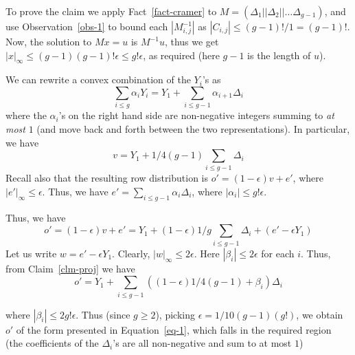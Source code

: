 \documentclass[a4paper]{article}
\begin{document}
To prove the claim we apply Fact~\ref{fact-cramer} to $M=(\Delta_1||\Delta_2||\ldots \Delta_{g-1})$, and use Observation~\ref{obs-1} to bound each $|{M}^{-1}_{i,j}|$ as $|C_{i,j}|\leq (g-1)!/1=(g-1)!$. Now, the solution to $Mx=u$ is $M^{-1}u$, thus we get $|x|_\infty\leq (g-1)(g-1)!\epsilon\leq g!\epsilon$, as required (here $g-1$ is the length of $u$).

We can rewrite a convex combination of the $Y_i$'s as
\begin{equation}\label{eq-1}
\sum_{i\leq g}\alpha_iY_i=Y_1+\sum_{i\leq g-1}\alpha_{i+1} \Delta_i
\end{equation}
where the $\alpha_i$'s on the right hand side are non-negative integers summing to \emph{at most} $1$ (and move back and forth between the two representations). In particular, we have
\[v = Y_1+1/4(g-1)\sum_{i\leq g-1}\Delta_i\]
Recall also that the resulting row distribution is
$o'=(1-\epsilon)v + e'$, where $|e'|_\infty\leq \epsilon$.
Thus, we have $e'=\sum_{i\leq g-1}\alpha_i\Delta_i$, where $|\alpha_i|\leq g!\epsilon$. 

Thus, we have
\[o'=(1-\epsilon)v+e'=Y_1+(1-\epsilon)1/g\sum_{i\leq g-1}\Delta_i+(e'-\epsilon Y_1)\]
Let us write $w=e'-\epsilon Y_1$. Clearly, $|w|_\infty\leq 2\epsilon$.
Here $|\beta_i|\leq 2\epsilon$ for each $i$.
Thus, from Claim~\ref{clm-proj} we have
\[o'= Y_1+\sum_{i\leq g-1}((1-\epsilon)1/4(g-1)+\beta_i)\Delta_i\]

where $|\beta_i|\leq 2g!\epsilon$. Thus (since $g\geq 2$), picking $\epsilon=1/10(g-1)(g!)$, we obtain $o'$ of the form presented in Equation~\ref{eq-1}, which falls in the required region (the coefficients of the $\Delta_i$'s are all non-negative and sum to at most $1$)


\end{document}
